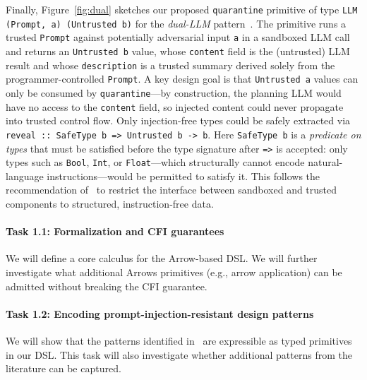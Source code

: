 \documentclass{kaw}
\begin{document}
Finally, Figure~\ref{fig:dual} sketches our proposed \texttt{quarantine}
primitive of type \texttt{LLM (Prompt, a) (Untrusted b)}
for the \emph{dual-LLM} pattern~\cite{BeurerKellner:Patterns25}.
%
The primitive runs a trusted \texttt{Prompt} against potentially
adversarial input \texttt{a} in a sandboxed LLM call and returns
an \texttt{Untrusted b} value,
whose \texttt{content} field is the (untrusted) LLM result and
whose \texttt{description} is a trusted summary derived solely
from the programmer-controlled \texttt{Prompt}.
%
A key design goal is that \texttt{Untrusted a} values can only
be consumed by \texttt{quarantine}---by construction, the
planning LLM would have no access to the \texttt{content} field, so injected content could never
propagate into trusted control flow.
%
Only injection-free types could be safely extracted via
\texttt{reveal :: SafeType b => Untrusted b -> b}.
%
Here \texttt{SafeType b} is a \emph{predicate on types} that
must be satisfied before the type signature after \texttt{=>}
is accepted: only types such as \texttt{Bool},
\texttt{Int}, or \texttt{Float}---which
structurally cannot encode natural-language instructions---would be permitted
to satisfy it.
%
This follows the recommendation of~\cite{BeurerKellner:Patterns25} to
restrict the interface between sandboxed and trusted components to
structured, instruction-free data.

\paragraph{Task 1.1: Formalization and CFI guarantees}
We will define a core calculus for the Arrow-based DSL. 
%
We will further investigate what additional Arrows primitives (e.g., arrow 
application) can be admitted without breaking the CFI guarantee.

\paragraph{Task 1.2: Encoding prompt-injection-resistant design patterns} We
will show that the patterns identified in~\cite{BeurerKellner:Patterns25} are
expressible as typed primitives in our DSL. 
% 
%
%
This task will also investigate whether additional patterns from the literature
can be captured. 
\end{document}
